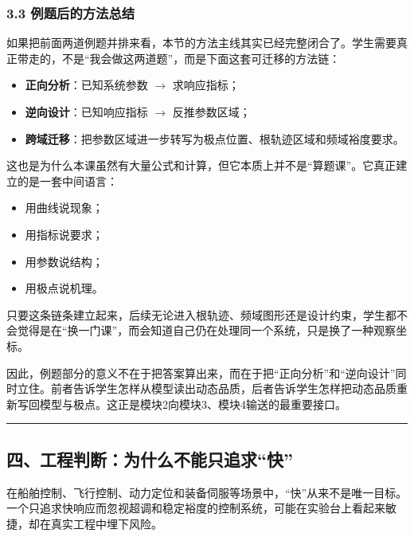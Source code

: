 \documentclass[
  11pt]{article}
\providecommand{\tightlist}{%
  \setlength{\itemsep}{0pt}\setlength{\parskip}{0pt}}
\begin{document}
\subsubsection{3.3
例题后的方法总结}\label{ux4f8bux9898ux540eux7684ux65b9ux6cd5ux603bux7ed3}

如果把前面两道例题并排来看，本节的方法主线其实已经完整闭合了。学生需要真正带走的，不是``我会做这两道题''，而是下面这套可迁移的方法链：

\begin{itemize}
\tightlist
\item
  \textbf{正向分析}：已知系统参数 \(\to\) 求响应指标；
\item
  \textbf{逆向设计}：已知响应指标 \(\to\) 反推参数区域；
\item
  \textbf{跨域迁移}：把参数区域进一步转写为极点位置、根轨迹区域和频域裕度要求。
\end{itemize}

这也是为什么本课虽然有大量公式和计算，但它本质上并不是``算题课''。它真正建立的是一套中间语言：

\begin{itemize}
\tightlist
\item
  用曲线说现象；
\item
  用指标说要求；
\item
  用参数说结构；
\item
  用极点说机理。
\end{itemize}

只要这条链条建立起来，后续无论进入根轨迹、频域图形还是设计约束，学生都不会觉得是在``换一门课''，而会知道自己仍在处理同一个系统，只是换了一种观察坐标。

因此，例题部分的意义不在于把答案算出来，而在于把``正向分析''和``逆向设计''同时立住。前者告诉学生怎样从模型读出动态品质，后者告诉学生怎样把动态品质重新写回模型与极点。这正是模块2向模块3、模块4输送的最重要接口。

\begin{center}\rule{0.5\linewidth}{0.5pt}\end{center}

\subsection{四、工程判断：为什么不能只追求``快''}\label{ux56dbux5de5ux7a0bux5224ux65adux4e3aux4ec0ux4e48ux4e0dux80fdux53eaux8ffdux6c42ux5feb}

在船舶控制、飞行控制、动力定位和装备伺服等场景中，``快''从来不是唯一目标。一个只追求快响应而忽视超调和稳定裕度的控制系统，可能在实验台上看起来敏捷，却在真实工程中埋下风险。
\end{document}
